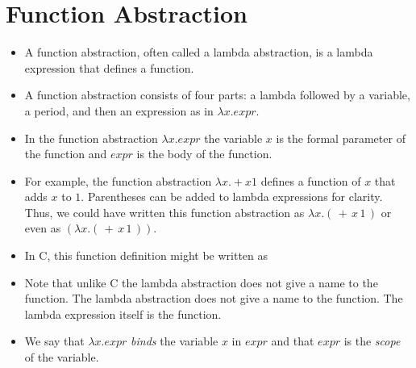 \documentclass[]{article}
\begin{document}
\section{Function Abstraction}
\begin{itemize}
\item A function abstraction, often called a lambda abstraction, is a lambda expression that defines a function.
\item A function abstraction consists of four parts: a lambda followed by a variable, a period, and then an expression as in $\lambda x.expr$.
\item In the function abstraction $\lambda x.expr$ the variable $x$ is the formal parameter of the function and $expr$ is the body of the function.
\item For example, the function abstraction $\lambda x.+x 1$ defines a function of $x$ that adds $x$ to $1$. Parentheses can be added to lambda expressions for clarity. Thus, we could have written this function abstraction as $\lambda x.(\,+\,x\,1\,)$ or even as $(\lambda x.(\,+\,x\,1\,))$.
\item In C, this function definition might be written as

\item Note that unlike C the lambda abstraction does not give a name to the function. The lambda abstraction does not give a name to the function. The lambda expression itself is the function.
\item We say that $\lambda x.expr$ \emph{binds} the variable $x$ in $expr$ and that $expr$ is the \emph{scope} of the variable.
\end{itemize}
\end{document}

